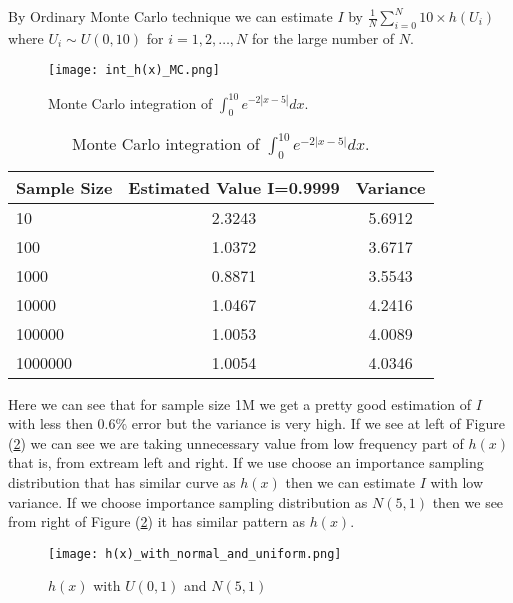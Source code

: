 \begin{example}
	By Ordinary Monte Carlo technique we can estimate $I$ by $\frac{1}{N}\sum_{i = 0}^{N} 10 \times h(U_i)$ where $U_i\sim U(0,10)$ for $i=1,2,\ldots,N$
	for the large number of $N$.
	\begin{figure}[H]
		\centering
		\texttt{[image: int\_h(x)\_MC.png]}
		\caption{Monte Carlo integration of $\int_{0}^{10} e^{-2 |x-5|} dx$.}
		\label{MC:IntegrationOFe-2|x*5|}
	\end{figure}
	\begin{table}[h]
		\centering
		\begin{tabular}{lcc}
			\hline
			Sample Size & Estimated Value I=0.9999 & Variance \\
			\hline
			10          & 2.3243                   & 5.6912   \\
			100         & 1.0372                   & 3.6717   \\
			1000        & 0.8871                   & 3.5543   \\
			10000       & 1.0467                   & 4.2416   \\
			100000      & 1.0053                   & 4.0089   \\
			1000000     & 1.0054                   & 4.0346   \\
			\hline
		\end{tabular}
		\caption{Monte Carlo integration of $\int_{0}^{10} e^{-2 |x-5|} dx$.}
		\label{tab:IntegrationOFe-2|x*5|}
	\end{table}
	Here we can see that for sample size 1M we get a pretty good estimation of $I$ with less then $0.6\%$ error but the variance is very high.
	If we see at left of Figure (\ref{fig:hxwithU01andN01}) we can see we are taking unnecessary value from low frequency part of $h(x)$ that is,
	from extream left and right. If we use choose an importance sampling distribution that has similar curve as $h(x)$ then we can estimate $I$ with low variance.
	If we choose importance sampling distribution as $N(5,1)$ then we see from right of Figure (\ref{fig:hxwithU01andN01}) it has similar pattern as $h(x)$.
	\begin{figure}[H]
		\centering
		\texttt{[image: h(x)\_with\_normal\_and\_uniform.png]}
		\caption{$h(x)$ with $U(0,1)$ and $N(5,1)$}
		\label{fig:hxwithU01andN01}
	\end{figure}


\end{example}
